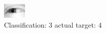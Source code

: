 \begin{figure}[h!]
\begin{center}
\includegraphics[width=0.60\columnwidth]{figures/ID2445_class_3_target_4.png}
\end{center}
\caption{ Classification: 3 actual target: 4}
\label{fig:ID2445_class_3_target_4}
\end{figure}
